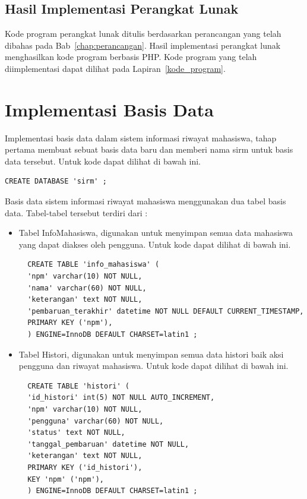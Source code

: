 \subsection{Hasil Implementasi Perangkat Lunak}
\label{sec:hasilimplementasi}

Kode program perangkat lunak ditulis berdasarkan perancangan yang telah dibahas pada Bab~\ref{chap:perancangan}. Hasil implementasi perangkat lunak menghasilkan kode program berbasis PHP. Kode program yang telah diimplementasi dapat dilihat pada Lapiran~\ref{kode_program}.

\section{Implementasi Basis Data}
\label{sec:implementasibasisdata}

Implementasi basis data dalam sistem informasi riwayat mahasiswa, tahap pertama membuat sebuat basis data baru dan memberi nama sirm untuk basis data tersebut. Untuk kode dapat dilihat di bawah ini.
\begin{lstlisting}
CREATE DATABASE 'sirm' ;
\end{lstlisting}

Basis data sistem informasi riwayat mahasiswa menggunakan dua tabel basis data. Tabel-tabel tersebut terdiri dari :
\begin{itemize}
\item Tabel InfoMahasiswa, digunakan untuk menyimpan semua data mahasiswa yang dapat diakses oleh pengguna. Untuk kode dapat dilihat di bawah ini.

\begin{lstlisting}
  CREATE TABLE 'info_mahasiswa' (
  'npm' varchar(10) NOT NULL,
  'nama' varchar(60) NOT NULL,
  'keterangan' text NOT NULL,
  'pembaruan_terakhir' datetime NOT NULL DEFAULT CURRENT_TIMESTAMP,
  PRIMARY KEY ('npm'),
  ) ENGINE=InnoDB DEFAULT CHARSET=latin1 ;
\end{lstlisting}

\item Tabel Histori, digunakan untuk menyimpan semua data histori baik aksi pengguna dan riwayat mahasiswa. Untuk kode dapat dilihat di bawah ini.
\begin{lstlisting}
  CREATE TABLE 'histori' (
  'id_histori' int(5) NOT NULL AUTO_INCREMENT,
  'npm' varchar(10) NOT NULL,
  'pengguna' varchar(60) NOT NULL,
  'status' text NOT NULL,
  'tanggal_pembaruan' datetime NOT NULL,
  'keterangan' text NOT NULL,
  PRIMARY KEY ('id_histori'),
  KEY 'npm' ('npm'),
  ) ENGINE=InnoDB DEFAULT CHARSET=latin1 ;
\end{lstlisting}
\end{itemize}

